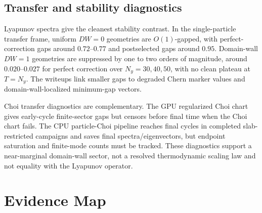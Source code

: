 \documentclass[aps,prb,onecolumn,nofootinbib,superscriptaddress]{revtex4-2}
\begin{document}
\subsection{Transfer and stability diagnostics}

Lyapunov spectra give the cleanest stability contrast.  In the single-particle transfer frame, uniform \(DW=0\) geometries are \(O(1)\)-gapped, with perfect-correction gaps around \(0.72\)--\(0.77\) and postselected gaps around \(0.95\).  Domain-wall \(DW=1\) geometries are suppressed by one to two orders of magnitude, around \(0.020\)--\(0.027\) for perfect correction over \(N_y=30,40,50\), with no clean plateau at \(T=N_y\).  The writeups link smaller gaps to degraded Chern marker values and domain-wall-localized minimum-gap vectors.

Choi transfer diagnostics are complementary.  The GPU regularized Choi chart gives early-cycle finite-sector gaps but censors before final time when the Choi chart fails.  The CPU particle-Choi pipeline reaches final cycles in completed slab-restricted campaigns and saves final spectra/eigenvectors, but endpoint saturation and finite-mode counts must be tracked.  These diagnostics support a near-marginal domain-wall sector, not a resolved thermodynamic scaling law and not equality with the Lyapunov operator.

\section{Evidence Map}
\end{document}
